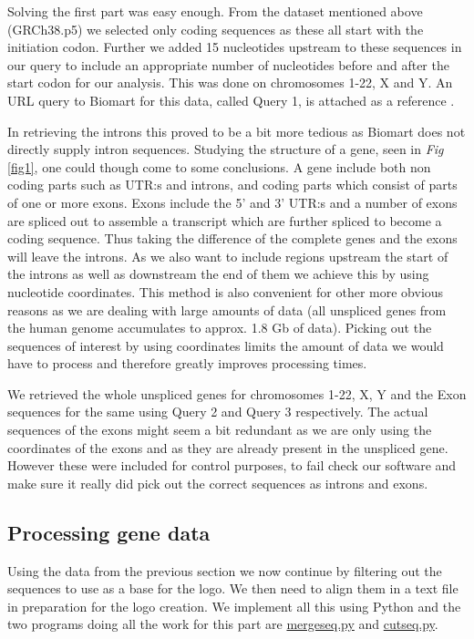 \documentclass[10pt,letterpaper]{article}
\begin{document}
Solving the first part was easy enough. From the dataset mentioned above (GRCh38.p5) we selected only coding sequences as these all start with the initiation codon. Further we added 15 nucleotides upstream to these sequences in our query to include an appropriate number of nucleotides before and after the start codon for our analysis. This was done on chromosomes 1-22, X and Y. An URL query to Biomart for this data, called Query 1, is attached as a reference \cite{bib7}.

In retrieving the introns this proved to be a bit more tedious as Biomart does not directly supply intron sequences. Studying the structure of a gene, seen in \textit{Fig} \ref{fig1}, one could though come to some conclusions. A gene include both non coding parts such as UTR:s and introns, and coding parts which consist of parts of one or more exons. Exons include the 5' and 3' UTR:s and a number of exons are spliced out to assemble a transcript which are further spliced to become a coding sequence. Thus taking the difference of the complete genes and the exons will leave the introns. As we also want to include regions upstream the start of the introns as well as downstream the end of them we achieve this by using nucleotide coordinates. This method is also convenient for other more obvious reasons as we are dealing with large amounts of data (all unspliced genes from the human genome accumulates to approx. 1.8 Gb of data). Picking out the sequences of interest by using coordinates limits the amount of data we would have to process and therefore greatly improves processing times.

We retrieved the whole unspliced genes for chromosomes 1-22, X, Y and the Exon sequences for the same using Query 2 \cite{bib8} and Query 3 \cite{bib9} respectively. The actual sequences of the exons might seem a bit redundant as we are only using the coordinates of the exons and as they are already present in the unspliced gene. However these were included for control purposes, to fail check our software and make sure it really did pick out the correct sequences as introns and exons.

\subsection*{Processing gene data}
Using the data from the previous section we now continue by filtering out the sequences to use as a base for the logo. We then need to align them in a text file in preparation for the logo creation. We implement all this using Python and the two programs doing all the work for this part are \href{https://github.com/jolo2486/unravel_motifs/blob/master/bin/mergeseq.py}{mergeseq.py} and \href{https://github.com/jolo2486/unravel_motifs/blob/master/bin/cutseq.py}{cutseq.py}.
\end{document}
